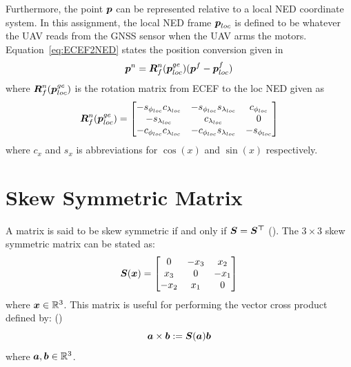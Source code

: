 Furthermore, the point $\boldsymbol{p}$ can be represented relative to a local NED coordinate system. In this assignment, the local NED frame $\boldsymbol{p}_{loc}$ is defined to be whatever the UAV reads from the GNSS sensor when the \gls{UAV} arms the motors. Equation~\ref{eq:ECEF2NED} states the position conversion given in \cite{cai2011unmanned}
\begin{equation}\label{eq:ECEF2NED}
  \boldsymbol{p}^n=\boldsymbol{R}_{f}^n(\boldsymbol{p}^{ge}_{loc})(\boldsymbol{p}^f-\boldsymbol{p}_{loc}^f)
\end{equation}
where $\boldsymbol{R}_{f}^n(\boldsymbol{p}^{ge}_{loc})$ is the rotation matrix from ECEF to the loc NED given as
\begin{equation}
  \boldsymbol{R}_{f}^n(\boldsymbol{p}^{ge}_{loc})=
  \begin{bmatrix}
    -s_{\phi_{loc}}c_{\lambda_{loc}} & -s_{\phi_{loc}}s_{\lambda_{loc}} & c_{\phi_{loc}}\\
    -s_{\lambda_{loc}} & c_{\lambda_{loc}} & 0\\
    -c_{\phi_{loc}}c_{\lambda_{loc}} & -c_{\phi_{loc}}s_{\lambda_{loc}} & -s_{\phi_{loc}}
  \end{bmatrix}
\end{equation}
where $c_x$ and $s_x$ is abbreviations for $\cos(x)$ and $\sin(x)$ respectively.


\section{Skew Symmetric Matrix}\label{sec:skew}
A matrix is said to be skew symmetric if and only if $\boldsymbol{S}=\boldsymbol{S^\top}$ (\cite{spong2006robot}). The $3\times3$ skew symmetric matrix can be stated as:
\begin{equation*}
\boldsymbol{S}(\boldsymbol{x})=
  \begin{bmatrix}
    0 & -x_{3} & x_{2}\\
    x_{3} & 0 & -x_{1}\\
    -x_{2} & x_{1} & 0
  \end{bmatrix}
\end{equation*}
where $\boldsymbol{x} \in \mathbb{R}^3$. This matrix is useful for performing the vector cross product defined by: (\cite{Fossen2011})
\begin{equation*}
  \boldsymbol{a} \times \boldsymbol{b} := \boldsymbol{S}(\boldsymbol{a})\boldsymbol{b}
\end{equation*}
where $\boldsymbol{a}, \boldsymbol{b} \in \mathbb{R}^3$.



